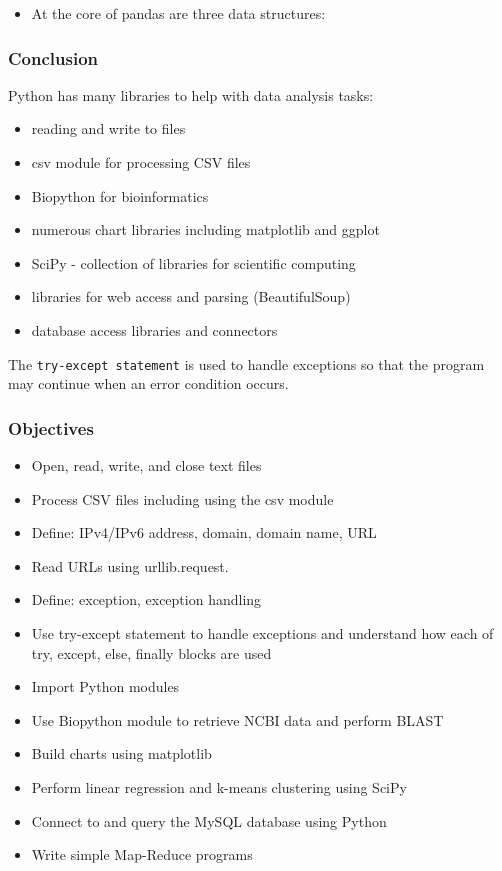 \documentclass[xcolor=svgnames, colorlinks, handout]{beamer}
\newcommand{\ft}[1]{\frametitle{#1}}
\begin{document}
\begin{frame}[fragile]{}
\begin{itemize}
\item At the core of pandas are three data structures:
\end{itemize}
\end{frame}



\begin{frame}[fragile]\ft{Conclusion }
Python has many libraries to help with data analysis tasks:

\begin{itemize}
\item reading and write to files
\item csv module for processing CSV files
\item Biopython for bioinformatics
\item numerous chart libraries including matplotlib and ggplot
\item SciPy - collection of libraries for scientific computing
\item libraries for web access and parsing (BeautifulSoup)
\item database access libraries and connectors
\end{itemize}
The {\tt try-except statement} is used to handle exceptions so that the program may continue when an error condition occurs.

\end{frame}

\begin{frame}\ft{Objectives}
\begin{itemize}
\item Open, read, write, and close text files
\item Process CSV files including using the csv module
\item Define: IPv4/IPv6 address, domain, domain name, URL
\item Read URLs using urllib.request.
\item Define: exception, exception handling
\item Use try-except statement to handle exceptions and understand how each of try, except, else, finally blocks are used
\item Import Python modules
\item Use Biopython module to retrieve NCBI data and perform BLAST
\item Build charts using matplotlib
\item Perform linear regression and k-means clustering using SciPy
\item Connect to and query the MySQL database using Python
\item Write simple Map-Reduce programs
\end{itemize}
\end{frame}
\end{document}
